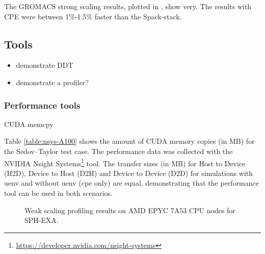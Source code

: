 The GROMACS strong scaling results, plotted in , show very.
The results with CPE were between 1\%-1.5\% faster than the Spack-stack.

\subsection{Tools}


\begin{itemize}
    \item demonstrate DDT
    \item demonstrate a profiler?
\end{itemize}

\subsubsection{Performance tools}

\begin{table}[htp!]
    \centering
    \caption{CUDA memcpy}
    \label{table:nsys-A100}
\end{table}

Table \ref{table:nsys-A100} shows the amount of CUDA memory copies (in MB) for the Sedov--Taylor test case.
The performance data was collected with the NVIDIA {Nsight Systems\footnote{\url{https://developer.nvidia.com/nsight-systems}}}  tool.
The transfer sizes (in MB) for Host to Device (H2D), Device to Host (D2H) and Device to Device (D2D) for simulations with uenv and without uenv (cpe only) are equal, demonstrating that the performance tool can be used in both scenarios.

\begin{figure}[htp!]
    \begin{center}
        
    \end{center}
    \caption{Weak scaling profiling results on AMD EPYC 7A53 CPU nodes for SPH-EXA.}
    \label{fig:sph-weak-scorep}
\end{figure}

